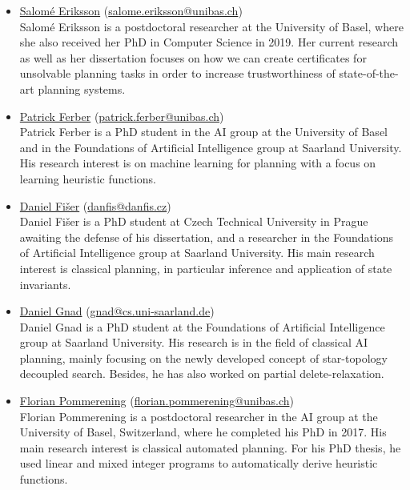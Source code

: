 \documentclass[10pt]{article}
\begin{document}
\begin{itemize}

\item \href{https://ai.dmi.unibas.ch/people/eriksson/}{Salom\'{e} Eriksson}
(\href{mailto:salome.eriksson@unibas.ch}{salome.eriksson@unibas.ch})\\
Salom\'{e} Eriksson is a postdoctoral researcher at the University of 
Basel, where she also received her PhD in Computer Science in 2019. Her
current research as well as her dissertation focuses on how we can
create certificates for unsolvable planning tasks in order to increase
trustworthiness of state-of-the-art planning systems.

\item \href{https://ai.dmi.unibas.ch/people/ferber/}{Patrick Ferber}
(\href{mailto:patrick.ferber@unibas.ch}{patrick.ferber@unibas.ch})\\
Patrick Ferber is a PhD student in the AI group at the University of 
Basel and in the Foundations of Artificial Intelligence group at 
Saarland University. His research interest is on machine learning for 
planning with a focus on learning heuristic functions.

\item \href{http://cs.fel.cvut.cz/en/people/fiserdan}{Daniel Fi\v{s}er}
(\href{mailto:danfis@danfis.cz}{danfis@danfis.cz})\\
Daniel Fi\v{s}er is a PhD student at Czech Technical University in Prague
awaiting the defense of his dissertation, and a researcher in the
Foundations of Artificial Intelligence group at Saarland University.
His main research interest is classical planning, in particular inference and
application of state invariants.

\item \href{http://fai.cs.uni-saarland.de/gnad/}{Daniel Gnad}
(\href{mailto:gnad@cs.uni-saarland.de}{gnad@cs.uni-saarland.de})\\
Daniel Gnad is a PhD student at the Foundations of Artificial
Intelligence group at Saarland University. His research is in the field
of classical AI planning, mainly focusing on the newly developed concept
of star-topology decoupled search. Besides, he has also worked on partial
delete-relaxation.

\item \href{http://ai.cs.unibas.ch/people/pommeren}{Florian Pommerening}
   (\href{mailto:florian.pommerening@unibas.ch}{florian.pommerening@unibas.ch})\\
Florian Pommerening is a postdoctoral researcher in the AI group at the
University of Basel, Switzerland, where he completed his PhD in 2017.
His main research interest is classical automated planning. For
his PhD thesis, he used linear and mixed integer programs to
automatically derive heuristic functions.


\end{itemize}
\end{document}
